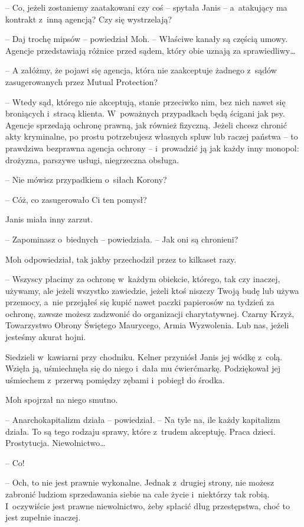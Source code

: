 \documentclass[oneside,polish,11pt,sfheadings]{mwbk}
\begin{document}
-- Co, jeżeli zostaniemy zaatakowani czy coś -- spytała Janis -- a~atakujący ma kontrakt z~inną agencją? Czy się wystrzelają?

-- Daj trochę mipsów -- powiedział Moh. -- Właściwe kanały są częścią
umowy. Agencje przedstawiają różnice przed sądem, który obie uznają za
sprawiedliwy\ldots

-- A załóżmy, że pojawi się agencja, która nie zaakceptuje żadnego z~sądów zasugerowanych przez Mutual Protection?

-- Wtedy sąd, którego nie akceptują, stanie przeciwko nim, bez nich nawet
się broniących i~stracą klienta. W~poważnych przypadkach będą ścigani
jak psy. Agencje sprzedają ochronę prawną, jak również fizyczną. Jeżeli
chcesz chronić akty kryminalne, po prostu potrzebujesz własnych spluw
lub raczej państwa -- to prawdziwa bezprawna agencja ochrony -- i~prowadzić ją jak każdy inny monopol: drożyzna, parszywe usługi,
niegrzeczna obsługa.

-- Nie mówisz przypadkiem o~siłach Korony?

-- Cóż, co zasugerowało Ci ten pomysł?

Janis miała inny zarzut. 

-- Zapominasz o~biednych -- powiedziała. -- Jak
oni są chronieni?

Moh odpowiedział, tak jakby przechodził przez to kilkaset razy. 

-- Wszyscy płacimy za ochronę w~każdym obiekcie, którego, tak czy inaczej,
używamy, ale jeżeli wszystko zawiedzie, jeżeli ktoś niszczy Twoją budę
lub używa przemocy, a~nie przejąłeś się kupić nawet paczki papierosów na
tydzień za ochronę, zawsze możesz zadzwonić do organizacji
charytatywnej. Czarny Krzyż, Towarzystwo Obrony Świętego Maurycego,
Armia Wyzwolenia. Lub nas, jeżeli jesteśmy akurat hojni.

Siedzieli w~kawiarni przy chodniku. Kelner przyniósł Janis jej wódkę z~colą. Wzięła ją, uśmiechnęła się do niego i~dała mu ćwierćmarkę.
Podziękował jej uśmiechem z~przerwą pomiędzy zębami i~pobiegł do środka.

Moh spojrzał na niego smutno.

-- Anarchokapitalizm działa -- powiedział. -- Na tyle na, ile każdy
kapitalizm działa. To są tego rodzaju sprawy, które z~trudem akceptuję.
Praca dzieci. Prostytucja. Niewolnictwo\ldots

-- Co!

-- Och, to nie jest prawnie wykonalne. Jednak z~drugiej strony, nie
możesz zabronić ludziom sprzedawania siebie na całe życie i~niektórzy
tak robią. I~oczywiście jest prawne niewolnictwo, żeby spłacić dług
przestępstwa, choć to jest zupełnie inaczej.
\end{document}
